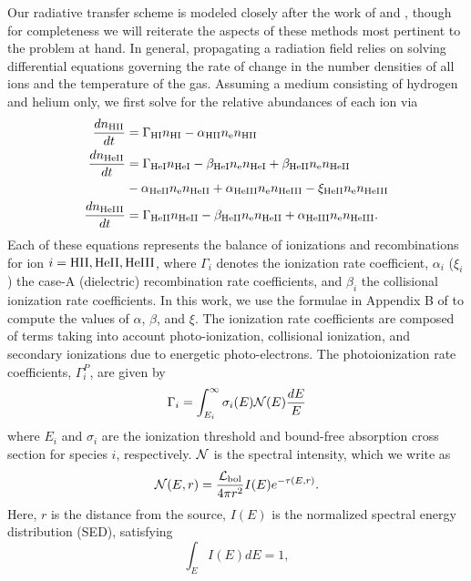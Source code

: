 \documentclass[preprint2]{aastex}              %
\begin{document}
Our radiative transfer scheme is modeled closely after the work of \cite{Fukugita1994} and \cite{Thomas2008}, though for completeness we will reiterate the aspects of these methods most pertinent to the problem at hand.  In general, propagating a radiation field relies on solving differential equations governing the rate of change in the number densities of all ions and the temperature of the gas.  Assuming a medium consisting of hydrogen and helium only, we first solve for the relative abundances of each ion via
\begin{align}
    \frac{d n_{\text{HII}}}{dt} & = \Gamma_{\text{HI}} n_{\text{HI}} - \alpha_{\text{HII}} n_{\text{e}} n_{\text{HII}}   \label{HIIRateEquation} \\
    \frac{d n_{\text{HeII}}}{dt} & = \Gamma_{\text{HeI}} n_{\text{HeI}} - \beta_{\text{HeI}} n_{\text{e}} n_{\text{HeI}} + \beta_{\text{HeII}} n_{\text{e}} n_{\text{HeII}} \label{HeIIRateEquation} \\ \nonumber 
    & - \alpha_{\text{HeII}} n_{\text{e}} n_{\text{HeII}} + \alpha_{\text{HeIII}} n_{\text{e}} n_{\text{HeIII}} - \xi_{\text{HeII}} n_{\text{e}} n_{\text{HeIII}}  \\
    \frac{d n_{\text{HeIII}}}{dt} & = \Gamma_{\text{HeII}} n_{\text{HeII}} - \beta_{\text{HeII}} n_{\text{e}} n_{\text{HeII}} + \alpha_{\text{HeIII}} n_{\text{e}} n_{\text{HeIII}} . \label{HeIIIRateEquation}
\end{align}
Each of these equations represents the balance of ionizations and recombinations for ion $i = \text{HII}, \text{HeII}, \text{HeIII}$, where $\Gamma_i$ denotes the ionization rate coefficient, $\alpha_i$ ($\xi_i$) the case-A (dielectric) recombination rate coefficients, and $\beta_i$ the collisional ionization rate coefficients.  In this work, we use the formulae in Appendix B of \cite{Fukugita1994} to compute the values of $\alpha$, $\beta$, and $\xi$.  The ionization rate coefficients are composed of terms taking into account photo-ionization, collisional ionization, and secondary ionizations due to energetic photo-electrons.  The photoionization rate coefficients, $\Gamma_i^P$, are given by
\begin{equation}
    \Gamma_i = \int_{E_i}^{\infty} \sigma_i(E) \mathcal{N}(E) \frac{dE}{E}    \label{PhotoionizationRate}
\end{equation}
where $E_i$ and $\sigma_i$ are the ionization threshold and bound-free absorption cross section for species $i$, respectively.  $\mathcal{N}$ is the spectral intensity, which we write as
\begin{equation}
    \mathcal{N}(E, r) = \frac{\mathcal{L}_{\text{bol}}}{4\pi r^2} I(E) e^{-\tau(E, r)} .
\end{equation}
Here, $r$ is the distance from the source, $I(E)$ is the normalized spectral energy distribution (SED), satisfying
\begin{equation}
    \int_E I(E) dE = 1 ,
\end{equation}
\end{document}
